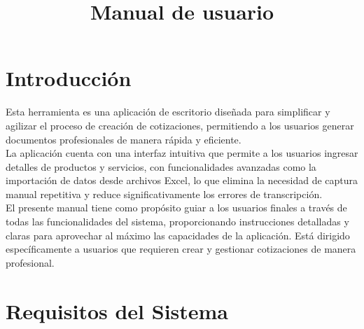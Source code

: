\documentclass{Pretexto/bluereport}
\title{Manual de usuario}
\author{}
\date{}
\begin{document}



\tableofcontents
\pagebreak

\section{Introducción}
Esta herramienta es una aplicación de escritorio diseñada para simplificar y agilizar el proceso de creación de cotizaciones, 
permitiendo a los usuarios generar documentos profesionales de manera rápida y eficiente. \\
La aplicación cuenta con una interfaz intuitiva que permite a los usuarios ingresar detalles de productos y servicios, con funcionalidades
avanzadas como la importación de datos desde archivos Excel, lo que elimina la necesidad de captura manual repetitiva y reduce significativamente 
los errores de transcripción. \\
El presente manual tiene como propósito guiar a los usuarios finales a través de todas las funcionalidades del sistema, proporcionando instrucciones 
detalladas y claras para aprovechar al máximo las capacidades de la aplicación. Está dirigido específicamente a usuarios que requieren crear y gestionar 
cotizaciones de manera profesional.

\section{Requisitos del Sistema}
\end{document}
